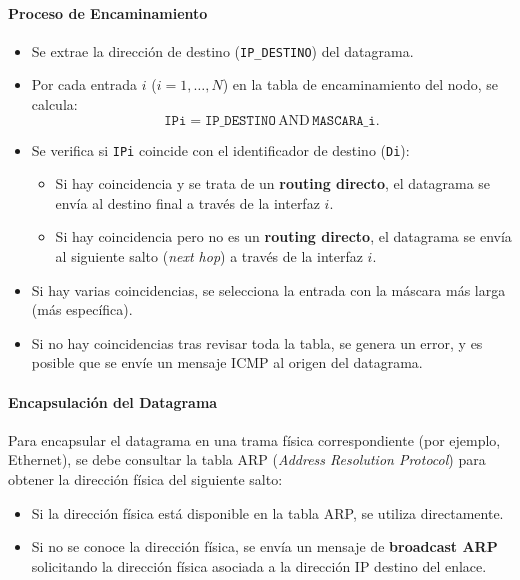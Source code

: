 \documentclass[a4paper,12pt]{article}
\begin{document}
\paragraph{Proceso de Encaminamiento}
\begin{itemize}
    \item Se extrae la dirección de destino (\texttt{IP\_DESTINO}) del datagrama.
    \item Por cada entrada \( i \) (\( i = 1, \dots, N \)) en la tabla de encaminamiento del nodo, se calcula:
    \[
    \texttt{IPi} = \texttt{IP\_DESTINO} \, \text{AND} \, \texttt{MASCARA\_i}.
    \]
    \item Se verifica si \texttt{IPi} coincide con el identificador de destino (\texttt{Di}):
    \begin{itemize}
        \item Si hay coincidencia y se trata de un \textbf{routing directo}, el datagrama se envía al destino final a través de la interfaz \( i \).
        \item Si hay coincidencia pero no es un \textbf{routing directo}, el datagrama se envía al siguiente salto (\textit{next hop}) a través de la interfaz \( i \).
    \end{itemize}
    \item Si hay varias coincidencias, se selecciona la entrada con la máscara más larga (más específica).
    \item Si no hay coincidencias tras revisar toda la tabla, se genera un error, y es posible que se envíe un mensaje ICMP al origen del datagrama.
\end{itemize}

\paragraph{Encapsulación del Datagrama}
Para encapsular el datagrama en una trama física correspondiente (por ejemplo, Ethernet), se debe consultar la tabla ARP (\textit{Address Resolution Protocol}) para obtener la dirección física del siguiente salto:
\begin{itemize}
    \item Si la dirección física está disponible en la tabla ARP, se utiliza directamente.
    \item Si no se conoce la dirección física, se envía un mensaje de \textbf{broadcast ARP} solicitando la dirección física asociada a la dirección IP destino del enlace.
\end{itemize}
\end{document}
